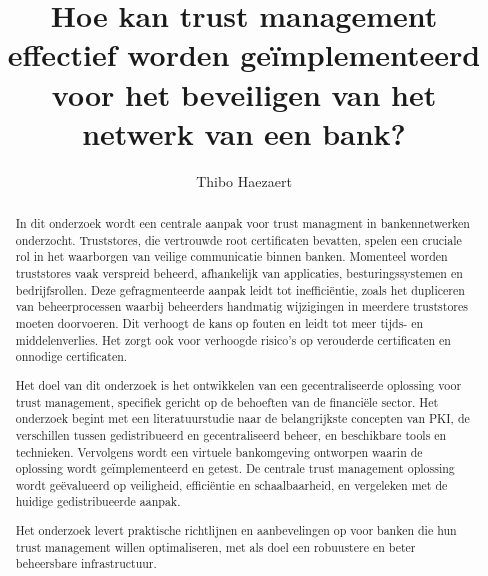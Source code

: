 \documentclass{hogent-article}
\title{Hoe kan trust management effectief worden geïmplementeerd voor het beveiligen van het netwerk van een bank?}
\author{Thibo Haezaert}
\begin{document}
\begin{abstract}
  In dit onderzoek wordt een centrale aanpak voor trust managment in bankennetwerken onderzocht. 
  Truststores, die vertrouwde root certificaten bevatten, spelen een cruciale rol in het waarborgen van veilige communicatie binnen banken. 
  Momenteel worden truststores vaak verspreid beheerd, afhankelijk van applicaties, besturingssystemen en bedrijfsrollen. 
  Deze gefragmenteerde aanpak leidt tot inefficiëntie, zoals het dupliceren van beheerprocessen waarbij beheerders handmatig wijzigingen in meerdere truststores moeten doorvoeren. Dit verhoogt de kans op fouten en leidt tot meer tijds- en middelenverlies. 
  Het zorgt ook voor verhoogde risico’s op verouderde certificaten en onnodige certificaten.

  Het doel van dit onderzoek is het ontwikkelen van een gecentraliseerde oplossing voor trust management, specifiek gericht op de behoeften van de financiële sector. 
  Het onderzoek begint met een literatuurstudie naar de belangrijkste concepten van PKI, de verschillen tussen gedistribueerd en gecentraliseerd beheer, en beschikbare tools en technieken. 
  Vervolgens wordt een virtuele bankomgeving ontworpen waarin de oplossing wordt geïmplementeerd en getest. 
  De centrale trust management oplossing wordt geëvalueerd op veiligheid, efficiëntie en schaalbaarheid, en vergeleken met de huidige gedistribueerde aanpak.

  Het onderzoek levert praktische richtlijnen en aanbevelingen op voor banken die hun trust management willen optimaliseren, met als doel een robuustere en beter beheersbare infrastructuur.  
\end{abstract}

\tableofcontents



\printbibliography[heading=bibintoc]
\end{document}
